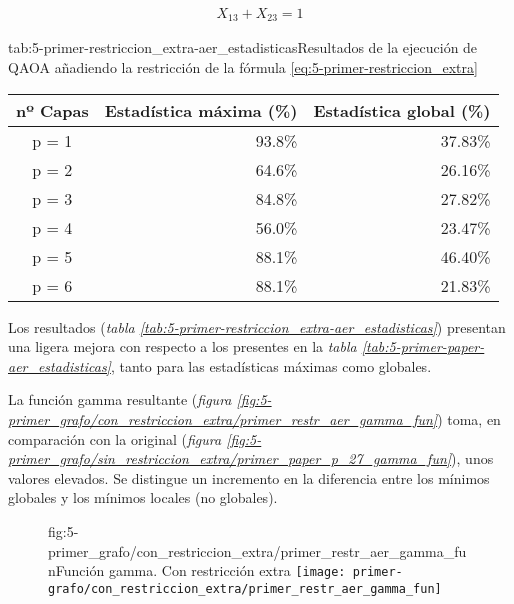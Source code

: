 \begin{align} \label{eq:5-primer-restriccion_extra}
  X_{13} + X_{23} = 1
\end{align}

\begin{table}[htbp]{tab:5-primer-restriccion_extra-aer_estadisticas}{Resultados de la ejecución de QAOA añadiendo la restricción de la fórmula \ref{eq:5-primer-restriccion_extra}}
  \centering
  \begin{tabular}{|c|r|r|}
    \hline
    \textbf{nº Capas} & \textbf{Estadística máxima (\%)} & \textbf{Estadística global (\%)} \\ \hline
    p = 1             & 93.8\%                           & 37.83\%                          \\ \hline
    p = 2             & 64.6\%                           & 26.16\%                          \\ \hline
    p = 3             & 84.8\%                           & 27.82\%                          \\ \hline
    p = 4             & 56.0\%                           & 23.47\%                          \\ \hline
    p = 5             & 88.1\%                           & 46.40\%                          \\ \hline
    p = 6             & 88.1\%                           & 21.83\%                          \\ \hline
  \end{tabular}
\end{table}

Los resultados (\textit{tabla \ref{tab:5-primer-restriccion_extra-aer_estadisticas}}) presentan una ligera mejora con respecto a los presentes en la \textit{tabla \ref{tab:5-primer-paper-aer_estadisticas}}, tanto para las estadísticas máximas como globales.

La función gamma resultante (\textit{figura \ref{fig:5-primer_grafo/con_restriccion_extra/primer_restr_aer_gamma_fun}}) toma, en comparación con la original (\textit{figura \ref{fig:5-primer_grafo/sin_restriccion_extra/primer_paper_p_27_gamma_fun}}), unos valores elevados. Se distingue un incremento en la diferencia entre los mínimos globales y los mínimos locales (no globales).

\begin{figure}[htbp]{fig:5-primer_grafo/con_restriccion_extra/primer_restr_aer_gamma_fun}{Función gamma. Con restricción extra}
  \centering
  \texttt{[image: primer-grafo/con\_restriccion\_extra/primer\_restr\_aer\_gamma\_fun]}
\end{figure}


